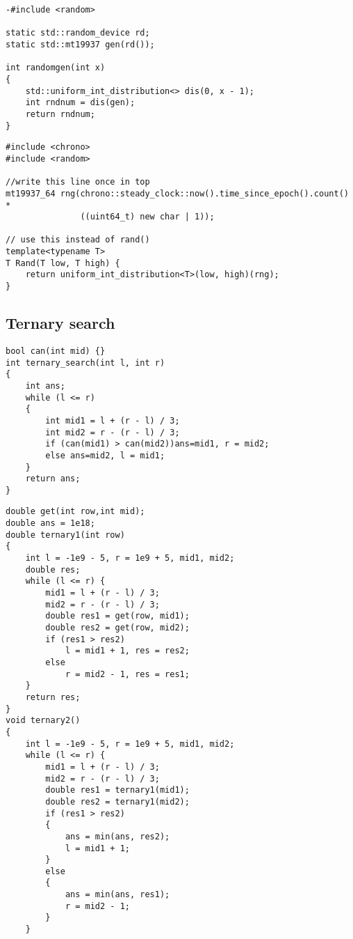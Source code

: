 {\begin{lstlisting}[style=cpp]
-#include <random>  
  
static std::random_device rd;  
static std::mt19937 gen(rd());  
  
int randomgen(int x)  
{  
    std::uniform_int_distribution<> dis(0, x - 1);  
    int rndnum = dis(gen);  
    return rndnum;  
}
\end{lstlisting}

\begin{lstlisting}[style=cpp]
#include <chrono>  
#include <random>  
  
//write this line once in top  
mt19937_64 rng(chrono::steady_clock::now().time_since_epoch().count() *  
               ((uint64_t) new char | 1));  
  
// use this instead of rand()  
template<typename T>  
T Rand(T low, T high) {  
    return uniform_int_distribution<T>(low, high)(rng);  
}
\end{lstlisting}

\subsection{Ternary search}

\begin{lstlisting}[style=cpp]
bool can(int mid) {}
int ternary_search(int l, int r)
{
	int ans;
	while (l <= r)
	{
		int mid1 = l + (r - l) / 3;
		int mid2 = r - (r - l) / 3;
		if (can(mid1) > can(mid2))ans=mid1, r = mid2;
		else ans=mid2, l = mid1;
	}
	return ans;
}
\end{lstlisting}

\begin{lstlisting}[style=cpp]
double get(int row,int mid);
double ans = 1e18;
double ternary1(int row)
{
    int l = -1e9 - 5, r = 1e9 + 5, mid1, mid2;
    double res;
    while (l <= r) {
        mid1 = l + (r - l) / 3;
        mid2 = r - (r - l) / 3;
        double res1 = get(row, mid1);
        double res2 = get(row, mid2);
        if (res1 > res2)
            l = mid1 + 1, res = res2;
        else
            r = mid2 - 1, res = res1;
    }
    return res;
}
void ternary2() 
{
    int l = -1e9 - 5, r = 1e9 + 5, mid1, mid2;
    while (l <= r) {
        mid1 = l + (r - l) / 3;
        mid2 = r - (r - l) / 3;
        double res1 = ternary1(mid1);
        double res2 = ternary1(mid2);
        if (res1 > res2)
        {
            ans = min(ans, res2);
            l = mid1 + 1;
        }
        else
        {
            ans = min(ans, res1);
            r = mid2 - 1;
        }
    }


\end{lstlisting}}
